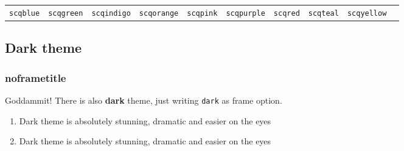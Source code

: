 \documentclass[aspectratio=169]{beamer}
\begin{document}
\begin{frame}[default]
\tiny
\begin{tabular}{m{1.08cm}m{1.08cm}m{1.08cm}m{1.08cm}m{1.08cm}m{1.08cm}m{1.08cm}m{1.08cm}m{1.08cm}m{1.08cm}}
  \centering\texttt{scqblue} &
  \centering\texttt{scqgreen} &
  \centering\texttt{scqindigo} &
  \centering\texttt{scqorange} &
  \centering\texttt{scqpink} &
  \centering\texttt{scqpurple} &
  \centering\texttt{scqred} &
  \centering\texttt{scqteal} &
  \centering\texttt{scqyellow}
\end{tabular}
\normalsize



\end{frame}


\subsection{Dark theme}


\begin{frame}[dark]
\frametitle{noframetitle}

\begin{center}
  \Large Goddammit! There is also \textbf{dark} theme,
  just writing \texttt{dark} as frame option.
\end{center}

\vspace{1cm}
\color{white}
\begin{enumerate}
  \item Dark theme is absolutely stunning, dramatic and easier on the
  eyes
  \item Dark theme is absolutely stunning, dramatic and easier on the
  eyes
\end{enumerate}

\end{frame}
\end{document}
